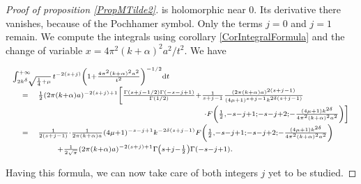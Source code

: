 \documentclass{jams-l}
\theoremstyle{definition}
\theoremstyle{remark}
\numberwithin{equation}{section}
\begin{document}
\begin{proof}[Proof of proposition \ref{PropMTilde2}]
                    \noindent is holomorphic near $0$. Its derivative there vanishes, because of the Pochhamer symbol. Only the terms $j = 0$ and $j = 1$ remain. We compute the integrals using corollary \ref{CorIntegralFormula} and the change of variable $x = 4 \pi^2 \left( k + \alpha \right)^2 a^2/t^2$. We have
                    
                    \[ \begin{array}{lll}
                            \multicolumn{3}{l}{\scriptstyle \int_{2 k^{\delta} \sqrt{\frac{1}{4} + \mu}}^{+ \infty} t^{- 2 \left( s + j \right)} \left( 1 + \frac{4 \pi^2 \left( k + \alpha \right)^2 a^2}{t^2} \right)^{-1/2} \mathrm{d}t} \\[0.5em]
                            
                            & \scriptstyle = & \scriptstyle \frac{1}{2} \left( 2 \pi \left( k + \alpha \right) a \right)^{- 2 \left( s + j \right) + 1} \left[ \frac{\Gamma \left( s+j -1/2 \right) \Gamma \left( -s-j+1 \right)}{\Gamma \left( 1/2 \right)} + \frac{1}{s + j - 1} \frac{\left( 2 \pi \left( k + \alpha \right) a \right)^{2 \left( s + j - 1 \right)}}{\left( 4 \mu + 1 \right)^{s+j-1} k^{2 \delta \left( s + j - 1 \right)}} \right. \\[0.5em]
                            
                            && \scriptstyle \qquad \qquad \qquad \qquad \qquad \qquad \qquad \qquad \quad \left. \cdot F \left( \frac{1}{2}, -s-j+1; -s-j+2; - \frac{\left( 4 \mu + 1 \right) k^{2 \delta}}{4 \pi^2 \left( k + \alpha \right)^2 a^2} \right) \right] \\[0.5em]
                            
                            & \scriptstyle = & \scriptstyle \frac{1}{2 \left( s + j - 1 \right)} \cdot \frac{1}{2 \pi \left( k + \alpha \right) a} \left( 4 \mu + 1 \right)^{-s-j+1} k^{- 2 \delta \left( s + j - 1 \right)} F \left( \frac{1}{2}, -s-j+1; -s-j+2; - \frac{\left( 4 \mu + 1 \right) k^{2 \delta}}{4 \pi^2 \left( k + \alpha \right)^2 a^2} \right) \\[0.5em]
                            
                            && \qquad \scriptstyle + \frac{1}{2 \sqrt{\pi}} \left( 2 \pi \left( k + \alpha \right) a \right)^{- 2 \left( s + j \right) + 1} \Gamma \left( s + j - \frac{1}{2} \right) \Gamma \left( -s-j+1 \right).
                        \end{array} \]
                    
                    \noindent Having this formula, we can now take care of both integers $j$ yet to be studied.
                    

\end{proof}
\end{document}
